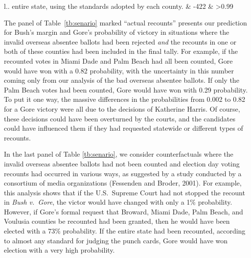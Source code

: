 \documentclass[11pt,titlepage]{article}
\begin{document}
\begin{table}[t]
\begin{center}
\begin{minipage}[c]{5.875in}
\begin{center}
\begin{tabular}{l..}
{        entire state, using the standards adopted by each county.} &
        -422 & >0.99 \\
        \hline
    \end{tabular}
    \end{center}
    \caption{Estimated margin and probability of victory
      if the invalid overseas absentee ballots had not been counted
      along with selected other counterfactuals (each of which also
      excludes the invalid absentee ballots).} \label{tb:senario}
  \end{minipage}
\end{center}
\end{table}

The panel of Table~\ref{tb:senario} marked ``actual recounts''
presents our prediction for Bush's margin and Gore's probability of
victory in situations where the invalid overseas absentee ballots had
been rejected \emph{and} the recounts in one or both of these counties
had been included in the final tally.  For example, if the recounted
votes in Miami Dade and Palm Beach had all been counted, Gore would
have won with a 0.82 probability, with the uncertainty in this number
coming only from our analysis of the bad overseas absentee ballots.
If only the Palm Beach votes had been counted, Gore would have won
with 0.29 probability.  To put it one way, the massive differences in
the probabilities from 0.002 to 0.82 for a Gore victory were all due
to the decisions of Katherine Harris.  Of course, these decisions
could have been overturned by the courts, and the candidates could
have influenced them if they had requested statewide or different
types of recounts.

In the last panel of Table \ref{tb:senario}, we consider
counterfactuals where the invalid overseas absentee ballots had not
been counted and election day voting recounts had occurred in various
ways, as suggested by a study conducted by a consortium of media
organizations (Fessenden and Broder, 2001).  For example, this
analysis shows that if the U.S.\ Supreme Court had not stopped the
recount in \emph{Bush v.\ Gore}, the victor would have changed with
only a 1\% probability.  However, if Gore's formal request that
Broward, Miami Dade, Palm Beach, and Voulusia counties be recounted
had been granted, then he would have been elected with a 73\%
probability.  If the entire state had been recounted, according to
almost any standard for judging the punch cards, Gore would have won
election with a very high probability.
\end{document}
